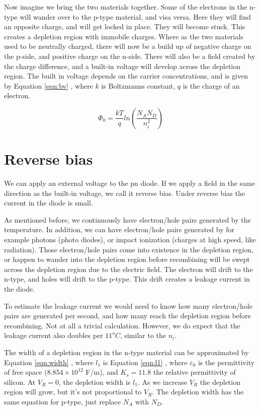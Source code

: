 \documentclass[technote,10pt,a4paper]{IEEEtran}
\newcommand{\req}[1]{Equation \ref{eqn:#1} }
\newcommand{\eqnr}[2]{
  \begin{equation}
    #1
    \label{eqn:#2}
  \end{equation}}
\begin{document}
Now imagine we bring the two materials together. Some of the electrons in the
n-type will wander over to the p-type material, and visa versa. Here they will
find an opposite charge, and will get locked in place. They will become stuck. This creates a depletion region with immobile charges.
Where as the two materials used to be neutrally charged, there will now be a
build up of negative charge on the p-side, and positive charge on the n-side.
 There will also be a
field created by the charge difference, and a built-in voltage will develop
across the depletion region. The built in voltage depends on the carrier
concentrations, and is given by \req{bv}, where $k$ is Boltzmanns constant, $q$ is
the charge of an electron.

\eqnr{ \Phi_0 = \frac{kT}{q} ln\left(  \frac{N_A N_D}{n_i^2} \right)}{bv}

\section{Reverse bias}
We can apply an external voltage to the pn diode. If we apply a field in the
same direction as the built-in voltage, we call it reverse bias. Under reverse
bias the current in the diode is small.

As mentioned before, we continuously
have electron/hole pairs generated by the temperature. In addition, we can have
electron/hole pairs generated by for example photons (photo diodes), or impact ionization
(charges at high speed, like radiation). Those electron/hole pairs come into
existence in the depletion region, or happen to wander into the depletion region
before recombining will be swept across the depletion region due to the electric
field.  The
electron will drift to the n-type, and holes will drift to the p-type. This
drift creates a leakage current in the diode.

To estimate the leakage current we would need to know how many electron/hole
pairs are generated per second, and how many reach the depletion region before
recombining. Not at all a trivial calculation. However, we do expect that the
leakage current also doubles per $11^{o}C$, similar to the $n_{i}$.

The width of a depletion region in the n-type material can be approximated by
\req{width}, where $l_{1}$ is \req{l1},
where $\varepsilon_{0}$ is the permittivity of free space
($8.854 \times 10^{12} $ F/m), and $K_{s} = 11.8$ the relative
permittivity of silicon. At $V_{R} = 0$, the depletion width is $l_{1}$. As we
increase $V_{R}$ the depletion region will grow, but it's not proportional to
$V_{R}$. The depletion width has the same equation for  p-type, just
replace $N_{A}$ with $N_{D}$.
\end{document}
